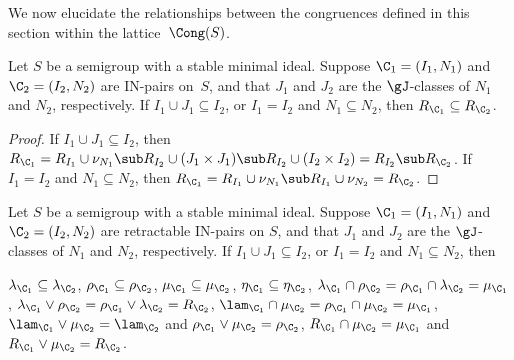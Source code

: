 We now elucidate the relationships between the congruences defined in this section within the lattice~$\Cong(S)$.

\begin{proposition}
\label{prop-CR2}
Let $S$ be a semigroup with a stable minimal ideal.  Suppose $\C_1=(I_1,N_1)$ and ${\C_2=(I_2, N_2)}$ are IN-pairs on~$S$, and that $J_1$ and $J_2$ are the $\gJ$-classes of $N_1$
  and $N_2$, respectively. If $I_1\cup J_1\subseteq I_2$, or $I_1=I_2$ and
  $N_1\subseteq N_2$, then $R_{\C_1}\subseteq R_{\C_2}$.
\end{proposition}

\begin{proof}  If $I_1\cup J_1\subseteq I_2$, then $R_{\C_1}=R_{I_1}\cup \nu_{N_1} \sub R_{I_2}\cup(J_1\times J_1)\sub R_{I_2}\cup(I_2\times I_2)=R_{I_2}\sub R_{\C_2}$.  
%
If $I_1=I_2$ and $N_1\subseteq N_2$, then $R_{\C_1}=R_{I_1}\cup\nu_{N_1}\sub R_{I_1}\cup\nu_{N_2}=R_{\C_2}$.
\end{proof}



\begin{proposition}
\label{prop-CR3}
Let $S$ be a semigroup with a stable minimal ideal.  Suppose $\C_1=(I_1,N_1)$ and ${\C_2=(I_2, N_2)}$ are retractable IN-pairs on $S$, and that $J_1$ and $J_2$ are the $\gJ$-classes of $N_1$ and $N_2$, respectively. If $I_1\cup J_1\subseteq I_2$, or $I_1=I_2$ and $N_1\subseteq N_2$, then
\begin{itemize}
\begin{multicols}{2}
 $\lambda_{\C_1}\subseteq \lambda_{\C_2}$,
$\rho_{\C_1}\subseteq \rho_{\C_2}$,
$\mu_{\C_1}\subseteq \mu_{\C_2}$,
$\eta_{\C_1}\subseteq \eta_{\C_2}$,
 $\lambda_{\C_1}\cap \rho_{\C_2}=\rho_{\C_1}\cap \lambda_{\C_2}=\mu_{\C_1}$, 
 $\lambda_{\C_1}\vee \rho_{\C_2}=\rho_{\C_1}\vee \lambda_{\C_2}=R_{\C_2}$,
 $\lam_{\C_1}\cap\mu_{\C_2} = \rho_{\C_1}\cap\mu_{\C_2} = \mu_{\C_1}$,
 $\lam_{\C_1}\vee\mu_{\C_2} = \lam_{\C_2}$ and $\rho_{\C_1}\vee\mu_{\C_2} = \rho_{\C_2}$,
 $R_{\C_1}\cap\mu_{\C_2}=\mu_{\C_1}$ and $R_{\C_1}\vee\mu_{\C_2}=R_{\C_2}$.
\end{multicols}
\end{itemize}
\end{proposition}

